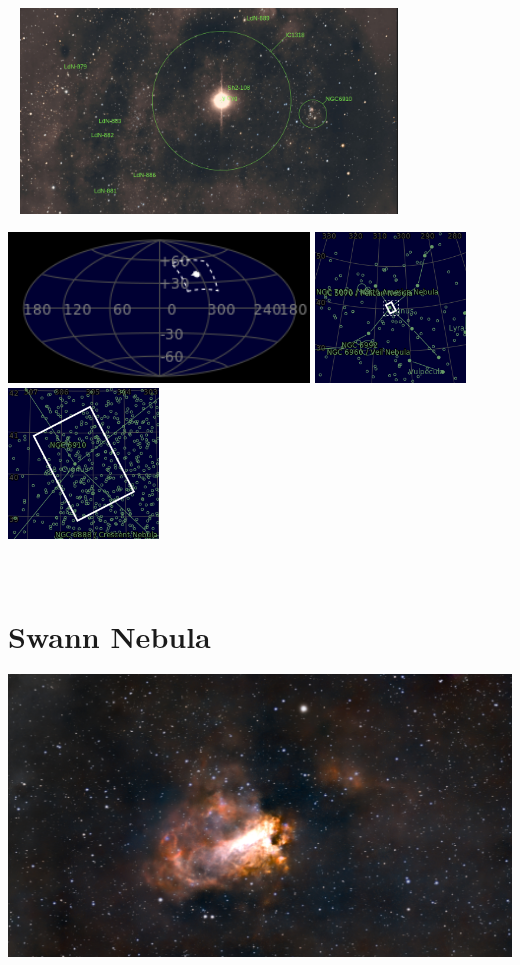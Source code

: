 \begin{center}
 \ \newpage
\includegraphics[width=0.75\textwidth]{../Imaging//Annotated/Sadr_Star_Annotated.jpg}

\includegraphics[height=4cm]{../Imaging//Annotated/Sadr_Star_Globe.jpg}
\includegraphics[height=4cm]{../Imaging//Annotated/Sadr_Star_Close.jpg}
\includegraphics[height=4cm]{../Imaging//Annotated/Sadr_Star_Closer.jpg}
\end{center}
\ \\\section{Swann Nebula}
\includegraphics[width=\textwidth]{../Imaging//Original/Swann_Nebula.jpg}
